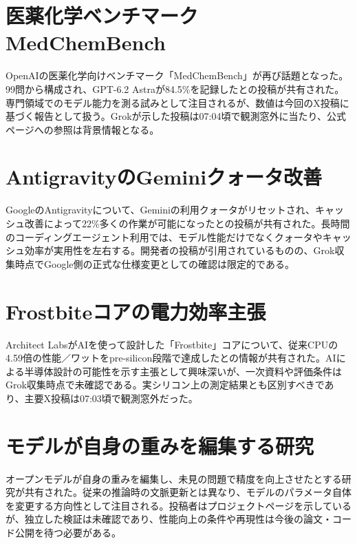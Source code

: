 \section{医薬化学ベンチマークMedChemBench}
OpenAIの医薬化学向けベンチマーク「MedChemBench」が再び話題となった。99問から構成され、GPT-6.2 Astraが84.5\%を記録したとの投稿が共有された。専門領域でのモデル能力を測る試みとして注目されるが、数値は今回のX投稿に基づく報告として扱う。Grokが示した投稿は07:04頃で観測窓外に当たり、公式ページへの参照は背景情報となる。

\section{AntigravityのGeminiクォータ改善}
GoogleのAntigravityについて、Geminiの利用クォータがリセットされ、キャッシュ改善によって22\%多くの作業が可能になったとの投稿が共有された。長時間のコーディングエージェント利用では、モデル性能だけでなくクォータやキャッシュ効率が実用性を左右する。開発者の投稿が引用されているものの、Grok収集時点でGoogle側の正式な仕様変更としての確認は限定的である。

\section{Frostbiteコアの電力効率主張}
Architect LabsがAIを使って設計した「Frostbite」コアについて、従来CPUの4.59倍の性能／ワットをpre-silicon段階で達成したとの情報が共有された。AIによる半導体設計の可能性を示す主張として興味深いが、一次資料や評価条件はGrok収集時点で未確認である。実シリコン上の測定結果とも区別すべきであり、主要X投稿は07:03頃で観測窓外だった。

\section{モデルが自身の重みを編集する研究}
オープンモデルが自身の重みを編集し、未見の問題で精度を向上させたとする研究が共有された。従来の推論時の文脈更新とは異なり、モデルのパラメータ自体を変更する方向性として注目される。投稿者はプロジェクトページを示しているが、独立した検証は未確認であり、性能向上の条件や再現性は今後の論文・コード公開を待つ必要がある。

